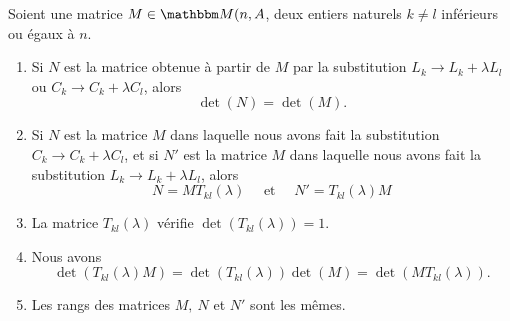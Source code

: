 \begin{proposition}     \label{PROPooPYNHooLbeVhj}
    Soient une matrice \( M\in \eM(n,A\), deux entiers naturels \( k\neq l\) inférieurs ou égaux à \( n\).
    \begin{enumerate}
        \item       \label{ITEMooJSRDooTggEyO}
            Si \( N \) est la matrice obtenue à partir de \( M\) par la substitution \( L_k\to L_k+\lambda L_l\) ou \( C_k\to C_k+\lambda C_l\), alors
            \begin{equation}
                \det(N)=\det(M).
            \end{equation}
        \item   \label{ITEMooHKZWooVZDgnf}
            Si \( N\) est la matrice \( M\) dans laquelle nous avons fait la substitution \( C_k\to C_k+\lambda C_l\), et si \( N'\) est la matrice \( M\) dans laquelle nous avons fait la substitution \( L_k\to L_k+\lambda L_l\), alors
            \begin{equation}
                N=MT_{kl}(\lambda)\quad\text{ et }\quad N'=T_{kl}(\lambda)M
            \end{equation}
           
        \item           \label{ITEMooPGYJooWTTghT}
            La matrice \( T_{kl}(\lambda)\) vérifie \( \det(T_{kl}(\lambda))=1\).
        \item       \label{ITEMooBBEAooZJVGNV}
            Nous avons 
            \begin{equation}
                \det(T_{kl}(\lambda)M)=\det(T_{kl}(\lambda))\det(M)=\det(MT_{kl}(\lambda)).
            \end{equation}
        \item     \label{ITEMooRangsTransvections}
        Les rangs des matrices \( M, \ N \) et \(N' \) sont les mêmes.
    \end{enumerate}
\end{proposition}

